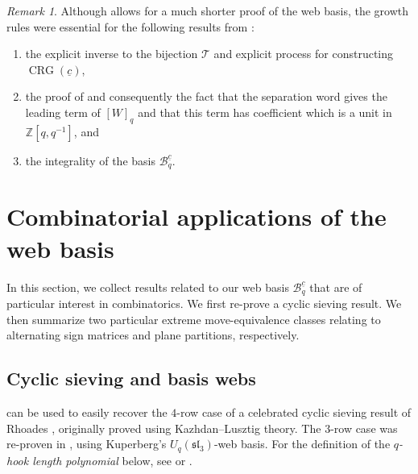 \documentclass{amsart}
\theoremstyle{definition}
\theoremstyle{remark}
\newtheorem{remark}[theorem]{Remark}
\numberwithin{equation}{section}
\newcommand{\fsl}{\mathfrak{sl}}
\DeclareMathOperator{\crg}{CRG}
\begin{document}
\begin{remark}\label{remark:what_we_lose}
Although  allows for a much shorter proof of the web basis, the growth rules were essential for the following results from : 
    \begin{enumerate}
        \item the explicit inverse to the bijection $\mathcal{T}$ and  explicit process for constructing $\crg(\underline{c})$,
        \item the proof of  and consequently the fact that the separation word gives the leading term of $[W]_q$ and that this term has coefficient which is a unit in $\mathbb{Z}[q,q^{-1}]$, and
        \item the integrality of the basis $\mathscr{B}_q^{\underline{c}}$.
    \end{enumerate}
\end{remark}

\section{Combinatorial applications of the web basis}
\label{sec:cc-asm-pp}
In this section, we collect results related to our web basis $\mathscr{B}_q^{\underline{c}}$ that are of particular interest in combinatorics.
We first re-prove a cyclic sieving result. We then summarize two particular extreme move-equivalence classes relating to alternating sign matrices and plane partitions, respectively. 

\subsection{Cyclic sieving and basis webs}
 can be used to easily recover the $4$-row case of a celebrated cyclic sieving result of Rhoades \cite{Rhoades}, originally proved using Kazhdan--Lusztig theory. The $3$-row case was re-proven in \cite{Petersen-Pylyavskyy-Rhoades}, using Kuperberg's $U_q(\fsl_3)$-web basis. For the definition of the \emph{$q$-hook length polynomial} below, see \cite[Cor.~7.21.6]{Stanley:EC2} or \cite{Rhoades}. 
\end{document}
